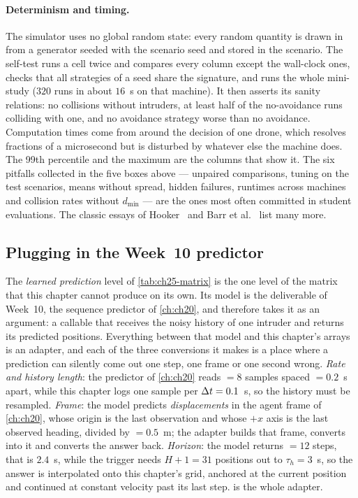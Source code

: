 \paragraph{Determinism and timing.}
The simulator uses no global random state: every random quantity is drawn in
 from a generator seeded with the scenario seed and
stored in the scenario. The self-test runs a cell twice and compares every
column except the wall-clock ones, checks that all strategies of a seed
share the signature, and runs the whole mini-study ($320$ runs in about
$16$~s on that machine). It then asserts its sanity relations: no collisions
without intruders, at least half of the no-avoidance runs colliding with
one, and no avoidance strategy worse than no avoidance. Computation times
come from  around the decision of one drone,
which resolves fractions of a microsecond but is disturbed by whatever else
the machine does. The 99th percentile and the maximum are the columns that
show it. The
six pitfalls collected in the five boxes above --- unpaired comparisons,
tuning on the test scenarios, means without spread, hidden failures,
runtimes across machines and collision rates without $d_{\min}$ --- are the
ones most often committed in student evaluations. The classic essays of
Hooker~\cite{hooker1995testing}
and Barr et al.~\cite{barr1995designing} list many more.


\subsection{Plugging in the Week~10 predictor}
\label{sec:ch25-week10}

The \emph{learned prediction} level of \cref{tab:ch25-matrix} is the one
level of the matrix that this chapter cannot produce on its own. Its model
is the deliverable of Week~10, the sequence predictor of \cref{ch:ch20}, and
 therefore takes it as an argument: a callable
that receives the noisy history of one intruder and returns its predicted
positions. Everything between that model and this chapter's arrays is an
adapter, and each of the three conversions it makes is a place where a
prediction can silently come out one step, one frame or one second wrong.
\emph{Rate and history length}: the predictor of \cref{ch:ch20} reads
 $= 8$ samples spaced  $= 0.2$~s apart, while
this chapter logs one sample per $\Delta t = 0.1$~s, so the history must be
resampled. \emph{Frame}: the model predicts \emph{displacements} in the
agent frame of \cref{ch:ch20}, whose origin is the last observation and
whose $+x$ axis is the last observed heading, divided by
 $= 0.5$~m; the adapter builds that frame, converts into
it and converts the answer back. \emph{Horizon}: the model returns
 $= 12$ steps, that is $2.4$~s, while the trigger needs
$H + 1 = 31$ positions out to $\tau_h = 3$~s, so the answer is interpolated
onto this chapter's grid, anchored at the current position and continued at
constant velocity past its last step.  is the whole
adapter.

